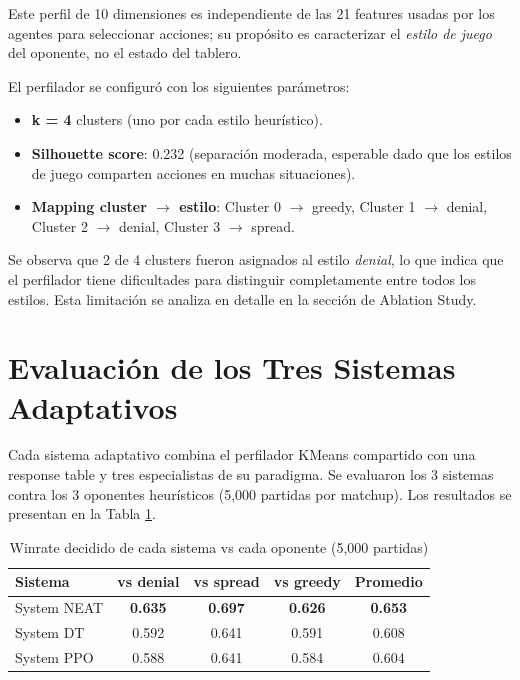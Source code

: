 Este perfil de 10 dimensiones es independiente de las 21 features usadas por los agentes para seleccionar acciones; su propósito es caracterizar el \textit{estilo de juego} del oponente, no el estado del tablero.

El perfilador se configuró con los siguientes parámetros:

\begin{itemize}
    \item \textbf{k = 4} clusters (uno por cada estilo heurístico).
    \item \textbf{Silhouette score}: 0.232 (separación moderada, esperable dado que los estilos de juego comparten acciones en muchas situaciones).
    \item \textbf{Mapping cluster $\to$ estilo}: Cluster 0 $\to$ greedy, Cluster 1 $\to$ denial, Cluster 2 $\to$ denial, Cluster 3 $\to$ spread.
\end{itemize}

Se observa que 2 de 4 clusters fueron asignados al estilo \textit{denial}, lo que indica que el perfilador tiene dificultades para distinguir completamente entre todos los estilos. Esta limitación se analiza en detalle en la sección de Ablation Study.

\section{Evaluación de los Tres Sistemas Adaptativos}

Cada sistema adaptativo combina el perfilador KMeans compartido con una response table y tres especialistas de su paradigma. Se evaluaron los 3 sistemas contra los 3 oponentes heurísticos (5,000 partidas por matchup). Los resultados se presentan en la Tabla \ref{tab:systems_comparison}.

\begin{table}[H]
\centering
\caption{Winrate decidido de cada sistema vs cada oponente (5,000 partidas)}
\begin{tabular}{lcccc}
\hline
\textbf{Sistema} & \textbf{vs denial} & \textbf{vs spread} & \textbf{vs greedy} & \textbf{Promedio} \\
\hline
System NEAT & \textbf{0.635} & \textbf{0.697} & \textbf{0.626} & \textbf{0.653} \\
System DT   & 0.592          & 0.641          & 0.591          & 0.608 \\
System PPO  & 0.588          & 0.641          & 0.584          & 0.604 \\
\hline
\end{tabular}
\label{tab:systems_comparison}
\end{table}

